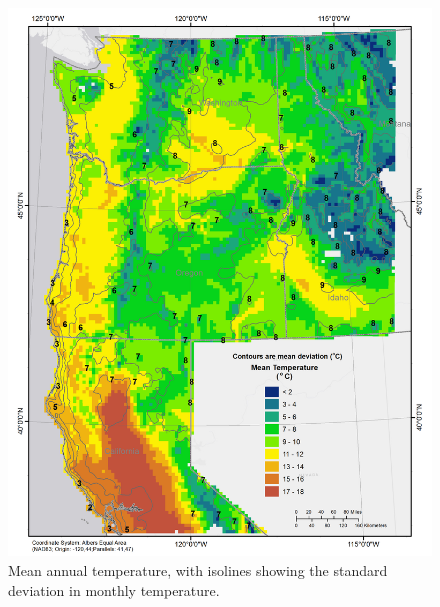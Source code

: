 \documentclass[preprint,review,12pt]{elsarticle}
\begin{document}
\begin{figure}[hp]
  \centering  
  \includegraphics[width=1\linewidth]{temp}  
\caption{Mean annual temperature, with isolines showing the standard deviation in monthly temperature.}
  \label{fig:temp}
\end{figure}
\end{document}

